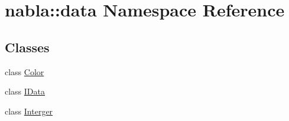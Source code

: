 \hypertarget{namespacenabla_1_1data}{}\section{nabla\+::data Namespace Reference}
\label{namespacenabla_1_1data}
\subsection*{Classes}
\begin{DoxyCompactItemize}
\item 
class \mbox{\hyperlink{classnabla_1_1data_1_1_color}{Color}}
\item 
class \mbox{\hyperlink{classnabla_1_1data_1_1_i_data}{I\+Data}}
\item 
class \mbox{\hyperlink{classnabla_1_1data_1_1_interger}{Interger}}
\end{DoxyCompactItemize}
